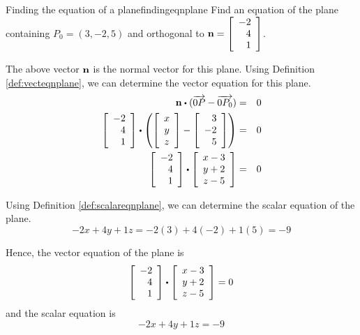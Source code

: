\begin{example}{Finding the equation of a plane}{findingeqnplane}
Find an equation of the plane containing $P_0 = (3, -2, 5)$ and orthogonal to ${\bf n} = 
\left[
\begin{array}{r}
-2 \\
4 \\
1
\end{array}
\right]$. 
\end{example}

\begin{solution}
The above vector ${\bf n}$ is the normal vector for this plane.
Using Definition \ref{def:vecteqnplane}, we can determine the vector equation for this plane. 
\begin{eqnarray*}
\vect{n} \dotprod (\longvect{0P} - \longvect{0P_0}) &=& 0 \\
\leftB
\begin{array}{r}
-2 \\
4 \\
1
\end{array}
\rightB 
\dotprod 
\left(\leftB
\begin{array}{c}
x \\
y \\
z
\end{array}
\rightB
-
\leftB
\begin{array}{r}
3 \\
-2 \\
5
\end{array}
\rightB \right) &=& 0 \\
\leftB
\begin{array}{r}
-2 \\
4 \\
1
\end{array}
\rightB 
\dotprod 
\leftB
\begin{array}{c}
x - 3 \\
y + 2 \\
z - 5
\end{array}
\rightB
&=& 0 
\end{eqnarray*} 

Using Definition \ref{def:scalareqnplane}, we can determine the scalar equation of the plane. 
\[
-2x + 4y + 1z = -2(3) + 4(-2) + 1(5) = -9
\]

Hence, the vector equation of the plane is
\[
\leftB
\begin{array}{r}
-2 \\
4 \\
1
\end{array}
\rightB 
\dotprod 
\leftB
\begin{array}{c}
x - 3 \\
y + 2 \\
z - 5
\end{array}
\rightB
= 0 
\]
and the scalar equation is 
\[
-2x + 4y + 1z = -9
\]
\end{solution}

